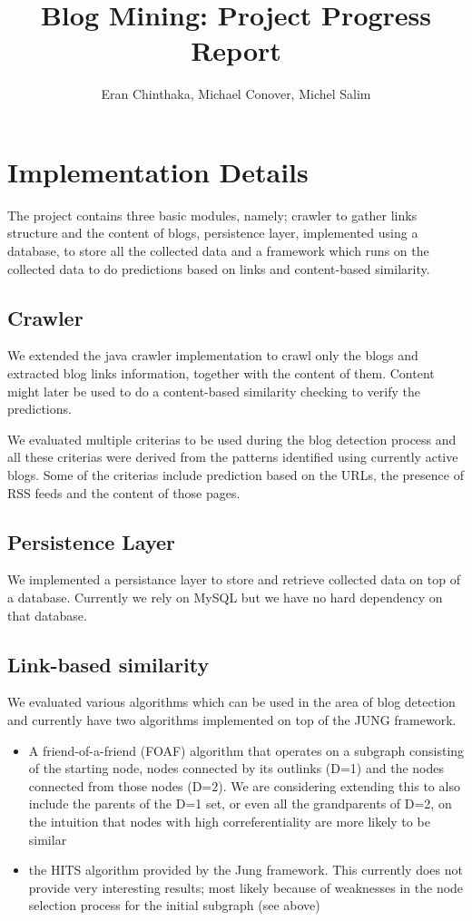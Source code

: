 \documentclass{article}
\author{Eran Chinthaka, Michael Conover, Michel Salim}
\title{Blog Mining: Project Progress Report}
\begin{document}


\maketitle

\section{Implementation Details}
The project contains three basic modules, namely; crawler to gather links
structure and the content of blogs, persistence layer, implemented using a
database, to store all the collected data and a framework which runs on the
collected data to do predictions based on links and content-based similarity.

\subsection{Crawler}
We extended the java crawler implementation \cite{JavaCrawler} to crawl only the
blogs and extracted blog links information, together with the content of them. 
Content might later be used to do a content-based similarity checking to verify
the predictions. 

We evaluated multiple criterias to be used during the blog detection
process and all these criterias were derived from the patterns
identified using currently active blogs. Some of the criterias include
prediction based on the URLs, the presence of RSS feeds and the
content of those pages.

\subsection{Persistence Layer}
We implemented a persistance layer to store and retrieve collected data on top
of a database. Currently we rely on MySQL but we have no hard dependency on that
database. 

\subsection{Link-based similarity}
We evaluated various algorithms which can be used in the area of blog
detection and currently have two algorithms implemented on top of the
JUNG \cite{Jung} framework.

\begin{itemize}
\item A friend-of-a-friend (FOAF) algorithm that operates on a
  subgraph consisting of the starting node, nodes connected by its
  outlinks (D=1) and the nodes connected from those nodes (D=2). We
  are considering extending this to also include the parents of the
  D=1 set, or even all the grandparents of D=2, on the intuition that
  nodes with high correferentiality are more likely to be similar

\item the HITS algorithm provided by the Jung framework. This
  currently does not provide very interesting results; most likely
  because of weaknesses in the node selection process for the initial
  subgraph (see above)
\end{itemize}
\end{document}
